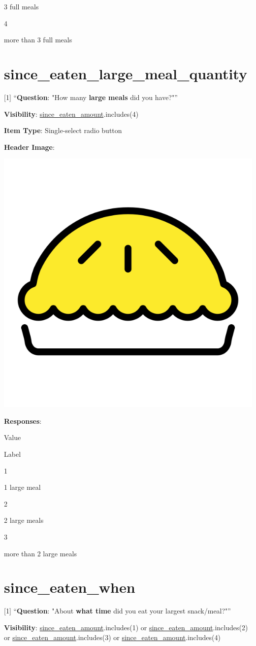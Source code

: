 \documentclass[]{book}
\begin{document}
3 full meals

4

more than 3 full meals

\hypertarget{since_eaten_large_meal_quantity}{%
\section{since\_eaten\_large\_meal\_quantity}\label{since_eaten_large_meal_quantity}}

{[}1{]} ``\textbf{Question}: "How many \textbf{large meals} did you have?"''

\textbf{Visibility}: \protect\hyperlink{since_eaten_amount}{since\_eaten\_amount}.includes(4)

\textbf{Item Type}: Single-select radio button

\textbf{Header Image}:

\begin{flushleft}\includegraphics[width=0.33\linewidth]{downloadFigs4latex_NIMH_Applet_Codebook/since_eaten_large_meal_quantity_headerImg} \end{flushleft}

\textbf{Responses}:

Value

Label

1

1 large meal

2

2 large meals

3

more than 2 large meals

\hypertarget{since_eaten_when}{%
\section{since\_eaten\_when}\label{since_eaten_when}}

{[}1{]} ``\textbf{Question}: "About \textbf{what time} did you eat your largest snack/meal?"''

\textbf{Visibility}: \protect\hyperlink{since_eaten_amount}{since\_eaten\_amount}.includes(1) or \protect\hyperlink{since_eaten_amount}{since\_eaten\_amount}.includes(2) or \protect\hyperlink{since_eaten_amount}{since\_eaten\_amount}.includes(3) or \protect\hyperlink{since_eaten_amount}{since\_eaten\_amount}.includes(4)
\end{document}
